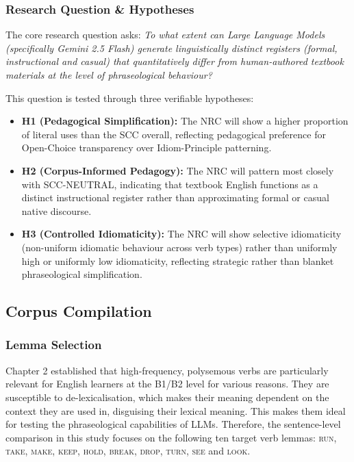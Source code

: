 \documentclass[11pt,a4paper]{article}
\begin{document}
\subsubsection{Research Question \& Hypotheses}\label{subsubsec:research-questions}

The core research question asks: \textit{To what extent can Large Language Models (specifically Gemini 2.5 Flash) generate linguistically distinct registers (formal, instructional and casual) that quantitatively differ from human-authored textbook materials at the level of phraseological behaviour?}

This question is tested through three verifiable hypotheses:

\begin{itemize}
\item \textbf{H1 (Pedagogical Simplification):\label{H1}} The NRC will show a higher proportion of literal uses than the SCC overall, reflecting pedagogical preference for Open-Choice transparency over Idiom-Principle patterning.

\item \textbf{H2 (Corpus-Informed Pedagogy):\label{H2}} The NRC will pattern most closely with SCC-NEUTRAL, indicating that textbook English functions as a distinct instructional register rather than approximating formal or casual native discourse.

\item \textbf{H3 (Controlled Idiomaticity):\label{H3}} The NRC will show selective idiomaticity (non-uniform idiomatic behaviour across verb types) rather than uniformly high or uniformly low idiomaticity, reflecting strategic rather than blanket phraseological simplification.
\end{itemize}

\subsection{Corpus Compilation}\label{subsec:corpus-compilation}

\subsubsection{Lemma Selection}\label{subsubsec:lemma-selection}

Chapter 2 established that high-frequency, polysemous verbs are particularly relevant for English learners at the B1/B2 level for various reasons. They are susceptible to de-lexicalisation, which makes their meaning dependent on the context they are used in, disguising their lexical meaning. This makes them ideal for testing the phraseological capabilities of LLMs. Therefore, the sentence-level comparison in this study focuses on the following ten target verb lemmas: \textsc{run}, \textsc{take}, \textsc{make}, \textsc{keep}, \textsc{hold}, \textsc{break}, \textsc{drop}, \textsc{turn}, \textsc{see} and \textsc{look}. 
\end{document}
